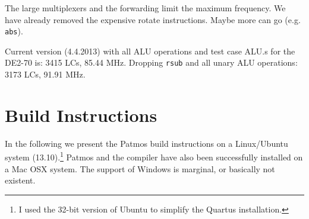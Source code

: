 \documentclass[a4paper,fontsize=10pt,twoside,DIV15,BCOR12mm,headinclude=true,footinclude=false,pagesize,bibtotoc]{scrbook}
\newcommand{\code}[1]{{\texttt{#1}}}
\begin{document}
The large multiplexers and the forwarding limit the maximum frequency.
We have already removed the expensive rotate instructions. Maybe more
can go (e.g. \code{abs}).

Current version (4.4.2013) with all ALU operations and test case ALU.s
for the DE2-70 is: 3415 LCs, 85.44 MHz. Dropping \code{rsub} and all unary
ALU operations: 3173 LCs, 91.91 MHz.


\chapter{Build Instructions}
\label{ch:build_instructions}

In the following we present the Patmos build instructions on a Linux/Ubuntu
system (13.10).\footnote{I used the 32-bit version of Ubuntu to simplify the Quartus installation.}
Patmos and the compiler have also been successfully installed on a Mac OSX
system.  The support of Windows is marginal, or basically not existent.


%
%
%
%
%
%
%
%
\end{document}
